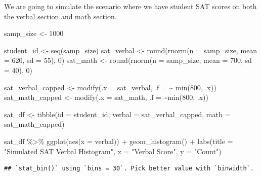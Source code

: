 \documentclass[
]{book}
\newenvironment{Shaded}{\begin{snugshade}}{\end{snugshade}}
\newcommand{\AttributeTok}[1]{\textcolor[rgb]{0.77,0.63,0.00}{#1}}
\newcommand{\DecValTok}[1]{\textcolor[rgb]{0.00,0.00,0.81}{#1}}
\newcommand{\FunctionTok}[1]{\textcolor[rgb]{0.00,0.00,0.00}{#1}}
\newcommand{\NormalTok}[1]{#1}
\newcommand{\OtherTok}[1]{\textcolor[rgb]{0.56,0.35,0.01}{#1}}
\newcommand{\SpecialCharTok}[1]{\textcolor[rgb]{0.00,0.00,0.00}{#1}}
\newcommand{\StringTok}[1]{\textcolor[rgb]{0.31,0.60,0.02}{#1}}
\begin{document}
We are going to simulate the scenario where we have student SAT scores on both the verbal section and math section.

\begin{Shaded}
\begin{Highlighting}[]
\NormalTok{samp\_size }\OtherTok{\textless{}{-}} \DecValTok{1000}

\NormalTok{student\_id }\OtherTok{\textless{}{-}} \FunctionTok{seq}\NormalTok{(samp\_size)}
\NormalTok{sat\_verbal }\OtherTok{\textless{}{-}} \FunctionTok{round}\NormalTok{(}\FunctionTok{rnorm}\NormalTok{(}\AttributeTok{n =}\NormalTok{ samp\_size, }\AttributeTok{mean =} \DecValTok{620}\NormalTok{, }\AttributeTok{sd =} \DecValTok{55}\NormalTok{), }\DecValTok{0}\NormalTok{)}
\NormalTok{sat\_math }\OtherTok{\textless{}{-}} \FunctionTok{round}\NormalTok{(}\FunctionTok{rnorm}\NormalTok{(}\AttributeTok{n =}\NormalTok{ samp\_size, }\AttributeTok{mean =} \DecValTok{700}\NormalTok{, }\AttributeTok{sd =} \DecValTok{40}\NormalTok{), }\DecValTok{0}\NormalTok{)}

\NormalTok{sat\_verbal\_capped }\OtherTok{\textless{}{-}} \FunctionTok{modify}\NormalTok{(}\AttributeTok{.x =}\NormalTok{ sat\_verbal, }\AttributeTok{.f =} \SpecialCharTok{\textasciitilde{}} \FunctionTok{min}\NormalTok{(}\DecValTok{800}\NormalTok{, .x))}
\NormalTok{sat\_math\_capped }\OtherTok{\textless{}{-}} \FunctionTok{modify}\NormalTok{(}\AttributeTok{.x =}\NormalTok{ sat\_math, }\AttributeTok{.f =} \SpecialCharTok{\textasciitilde{}}\FunctionTok{min}\NormalTok{(}\DecValTok{800}\NormalTok{, .x))}

\NormalTok{sat\_df }\OtherTok{\textless{}{-}} \FunctionTok{tibble}\NormalTok{(}\AttributeTok{id =}\NormalTok{ student\_id,}
                 \AttributeTok{verbal =}\NormalTok{ sat\_verbal\_capped,}
                 \AttributeTok{math =}\NormalTok{ sat\_math\_capped)}

\NormalTok{sat\_df }\SpecialCharTok{\%\textgreater{}\%} \FunctionTok{ggplot}\NormalTok{(}\FunctionTok{aes}\NormalTok{(}\AttributeTok{x =}\NormalTok{ verbal)) }\SpecialCharTok{+}
  \FunctionTok{geom\_histogram}\NormalTok{() }\SpecialCharTok{+}
  \FunctionTok{labs}\NormalTok{(}\AttributeTok{title =} \StringTok{"Simulated SAT Verbal Histogram"}\NormalTok{,}
       \AttributeTok{x =} \StringTok{"Verbal Score"}\NormalTok{,}
       \AttributeTok{y =} \StringTok{"Count"}\NormalTok{)}
\end{Highlighting}
\end{Shaded}

\begin{verbatim}
## `stat_bin()` using `bins = 30`. Pick better value with `binwidth`.
\end{verbatim}
\end{document}
